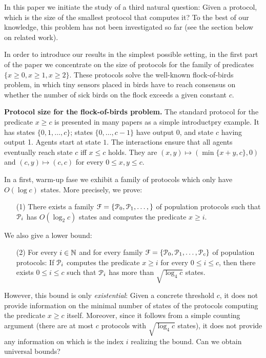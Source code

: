In this paper we initiate the study of a third natural question: Given
a protocol, which is the size of the smallest protocol that computes
it? To the best of our knowledge, this problem has not been
investigated so far (see the section below on related work).

In order to introduce our results in the simplest possible setting, in
the first part of the paper we concentrate on the size of protocols
for the family of predicates $\{x \geq 0, x \geq 1, x \geq
2 \}$. These protocols solve the well-known flock-of-birds problem, in
which tiny sensors placed in birds have to reach consensus on whether
the number of sick birds on the flock exceeds a given constant $c$.

\medskip\noindent \textbf{Protocol size for the flock-of-birds
  problem.} The standard protocol for the predicate $x \geq c$ is
presented in many papers as a simple introductpry example. It has
states $\{0, 1, \ldots, c\}$; states $\{0 , \ldots, c-1\}$ have output
$0$, and state $c$ having output 1. Agents start at state $1$. The
interactions ensure that all agents eventually reach state $c$ if{}f
$x \leq c$ holds. They are $(x, y) \mapsto (\min\{x+y,c\}, 0)$ and
$(c,y) \mapsto (c,c)$ for every $0 \leq x, y \leq c$.

In a first, warm-up fase we exhibit a family of protocols which only
have $O(\log c)$ states. More precisely, we prove:
\begin{itemize}
\item[(1)] There exists a family $\mathcal{F} = \{\mathcal{P}_0, \mathcal{P}_1,
  \ldots, \}$ of population protocols such that $\mathcal{P}_i$ has $O(\log_2
  c)$ states and computes the predicate $x \geq i$.
\end{itemize}
We also give a lower bound:
\begin{itemize}
\item[(2)] For every $i \in \mathbb{N}$ and for every family $\mathcal{F} =
  \{\mathcal{P}_0, \mathcal{P}_1, \ldots, \mathcal{P}_c\}$ of population protocols: If $\mathcal{P}_i$
  computes the predicate $x \geq i$ for every $0 \leq i \leq c$, then
  there exists $0 \leq i \leq c$ such that $\mathcal{P}_i$ has more than
  $\sqrt{\log_4 c}$ states.
\end{itemize}
However, this bound is only \emph{existential}: Given a concrete
threshold $c$, it does not provide information on the minimal number
of states of the protocols computing the predicate $x \geq c$
itself. Moreover, since it follows from a simple counting argument
(there are at most $c$ protocols with $\sqrt{\log_4 c}$ states), it
does not provide any information on which is the index $i$ realizing
the bound. Can we obtain universal bounds?

